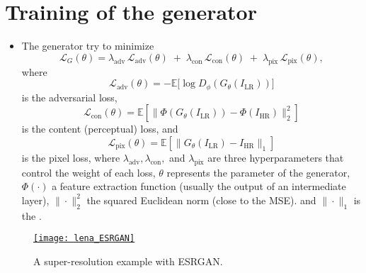 \section*{Training of the generator}
\begin{itemize}
\item The generator try to minimize
\begin{equation}
\mathcal{L}_G(\theta) = 
\lambda_{\text{adv}} \, \mathcal{L}_{\text{adv}}(\theta) \;+\;
\lambda_{\text{con}} \, \mathcal{L}_{\text{con}}(\theta) \;+\;
\lambda_{\text{pix}} \, \mathcal{L}_{\text{pix}}(\theta),
\end{equation}
where
\begin{equation}
  \mathcal{L}_{\text{adv}}(\theta) = - \mathbb{E}\big[ \log D_\phi(G_\theta(I_{\text{LR}})) \big]
\end{equation}
is the adversarial loss,
\begin{equation}
\mathcal{L}_{\text{con}}(\theta) = \mathbb{E}\left[ \big\| \Phi(G_\theta(I_{\text{LR}})) - \Phi(I_{\text{HR}}) \big\|_2^2 \right]
\end{equation}
is the content (perceptual) loss, and
\begin{equation}
\mathcal{L}_{\text{pix}}(\theta) = \mathbb{E}\left[ \| G_\theta(I_{\text{LR}}) - I_{\text{HR}} \|_1 \right]
\end{equation}
is the pixel loss, where $\lambda_{\text{adv}}, \lambda_{\text{con}},$
and $\lambda_{\text{pix}}$ are three hyperparameters that control the
weight of each loss, $\theta$ represents the parameter of the
generator, $\Phi(\cdot)$ a feature extraction function (usually the
output of an intermediate layer), $\big\|\cdot\big\|_2^2$ the squared
Euclidean norm (close to the \gls{MSE}). and $\|\cdot\|_1$ is the .

\end{itemize}

\begin{figure}[H]
  \vspace{0ex}
  \centering
  \href{https://github.com/vicente-gonzalez-ruiz/medical_imaging/blob/main/notebooks/ESRGAN.ipynb}{\texttt{[image: lena\_ESRGAN]}}
  \caption{A super-resolution example with \gls{ESRGAN}.}
  \label{fig:ESRGAN_example}
\end{figure}

